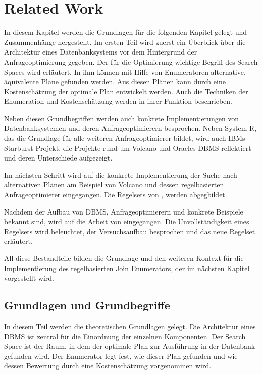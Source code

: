 \chapter{Related Work}


In diesem Kapitel werden die Grundlagen für die folgenden Kapitel gelegt und Zusammenhänge hergestellt. Im ersten Teil wird zuerst ein Überblick über die Architektur eines Datenbanksystems vor dem Hintergrund der Anfrageoptimierung gegeben. Der für die Optimierung wichtige Begriff des Search Spaces wird erläutert. In ihm können mit Hilfe von Enumeratoren alternative, äquivalente Pläne gefunden werden. Aus diesen Plänen kann  durch eine Kostenschätzung der optimale Plan entwickelt werden. Auch die Techniken der Enumeration und Kostenschätzung werden in ihrer Funktion beschrieben.

Neben diesen Grundbegriffen werden auch konkrete Implementierungen von Datenbanksystemen und deren Anfrageoptimierern besprochen. Neben System R, das die Grundlage für alle weiteren Anfrageoptimierer bildet, wird auch IBMs Starburst Projekt, die Projekte rund um Volcano und Oracles DBMS reflektiert und deren Unterschiede aufgezeigt.

Im nächsten Schritt wird auf die konkrete Implementierung der Suche nach alternativen Plänen am Beispiel von Volcano und dessen regelbasierten Anfrageoptimierer eingegangen. Die Regelsets von \cite{pellenkoft1997complexity}, \cite{pellenkoft1997duplicate} werden abgegbildet.

Nachdem der Aufbau von DBMS, Anfrageoptimierern und konkrete Beispiele bekannt sind, wird auf die Arbeit von \cite{shanbhag2014optimizing} eingegangen. Die Unvollständigkeit eines Regelsets wird beleuchtet, der Versuchsaufbau besprochen und das neue Regelset erläutert.

All diese Bestandteile bilden die Grundlage und den weiteren Kontext für die Implementierung des regelbasierten Join Enumerators, der im nächsten Kapitel vorgestellt wird.






\section{Grundlagen und Grundbegriffe}

In diesem Teil werden die theoretischen Grundlagen gelegt. Die Architektur eines DBMS ist zentral für die Einordnung der einzelnen Komponenten. Der Search Space ist der Raum, in dem der optimale Plan zur Ausführung in der Datenbank gefunden wird. Der Enumerator legt fest, wie dieser Plan gefunden und wie  dessen Bewertung durch eine Kostenschätzung vorgenommen wird.


